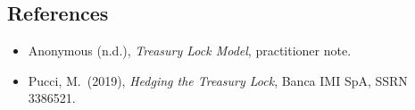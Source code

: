 \documentclass[11pt,a4paper]{article}
\begin{document}
\subsection*{References}
\begin{itemize}[noitemsep]
\item Anonymous (n.d.), \emph{Treasury Lock Model}, practitioner note.
\item Pucci, M.\ (2019), \emph{Hedging the Treasury Lock}, Banca IMI SpA, SSRN 3386521.
\end{itemize}
\end{document}

